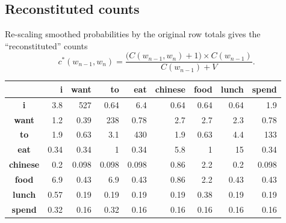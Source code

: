 \documentclass[11pt,a4paper]{article}
\theoremstyle{definition}
\theoremstyle{plain}
\theoremstyle{remark}
\begin{document}
\subsection{Reconstituted counts}
Re-scaling smoothed probabilities by the original row totals gives the ``reconstituted'' counts
\[
c^{*}(w_{n-1},w_n)=\frac{\big(C(w_{n-1},w_n)+1\big)\times C(w_{n-1})}{C(w_{n-1})+V}.
\]
\begin{center}
\setlength{\tabcolsep}{6pt}
\renewcommand{\arraystretch}{1.2}
\scriptsize
\begin{tabular}{|c|r|r|r|r|r|r|r|r|}
\hline
 & \textbf{i} & \textbf{want} & \textbf{to} & \textbf{eat} & \textbf{chinese} & \textbf{food} & \textbf{lunch} & \textbf{spend} \\ \hline
\textbf{i}       & 3.8  & 527  & 0.64 & 6.4  & 0.64 & 0.64 & 0.64 & 1.9  \\ \hline
\textbf{want}    & 1.2  & 0.39 & 238  & 0.78 & 2.7  & 2.7  & 2.3  & 0.78 \\ \hline
\textbf{to}      & 1.9  & 0.63 & 3.1  & 430  & 1.9  & 0.63 & 4.4  & 133  \\ \hline
\textbf{eat}     & 0.34 & 0.34 & 1    & 0.34 & 5.8  & 1    & 15   & 0.34 \\ \hline
\textbf{chinese} & 0.2  & 0.098& 0.098& 0.098& 0.86 & 2.2  & 0.2  & 0.098\\ \hline
\textbf{food}    & 6.9  & 0.43 & 6.9  & 0.43 & 0.86 & 2.2  & 0.43 & 0.43 \\ \hline
\textbf{lunch}   & 0.57 & 0.19 & 0.19 & 0.19 & 0.19 & 0.38 & 0.19 & 0.19 \\ \hline
\textbf{spend}   & 0.32 & 0.16 & 0.32 & 0.16 & 0.16 & 0.16 & 0.16 & 0.16 \\ \hline
\end{tabular}
\end{center}
\end{document}

